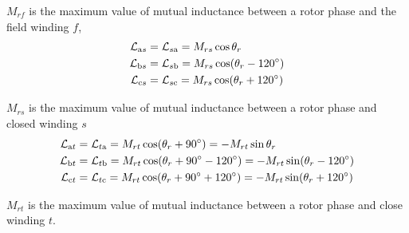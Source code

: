 \documentclass[a4paper,numbers=noenddot,12pt]{scrbook}
\begin{document}
        $M_{rf}$ is the maximum value of mutual inductance between a rotor phase and the field winding $f$,
        \begin{equation}
            \begin{aligned}
                \mathcal{L}_{\textup{a}s} & = \mathcal{L}_{s\textup{a}} = M_{rs} \cos \theta_r \\
                \mathcal{L}_{\textup{b}s} & = \mathcal{L}_{s\textup{b}} = M_{rs} \cos (\theta_r - 120^{\circ}) \\
                \mathcal{L}_{\textup{c}s} & = \mathcal{L}_{s\textup{c}} = M_{rs} \cos (\theta_r + 120^{\circ}) \\
            \end{aligned}
            \label{eq:Eq8.18}
        \end{equation}

        $M_{rs}$ is the maximum value of mutual inductance between a rotor phase and closed winding $s$
        \begin{equation}
            \begin{aligned}
                \mathcal{L}_{\textup{a}t} & = \mathcal{L}_{t\textup{a}} = M_{rt} \cos (\theta_r + 90^{\circ}) = -M_{rt} \sin \theta_r \\
                \mathcal{L}_{\textup{b}t} & = \mathcal{L}_{t\textup{b}} = M_{rt} \cos (\theta_r + 90^{\circ} - 120^{\circ}) =  -M_{rt} \sin (\theta_r - 120^{\circ}) \\
                \mathcal{L}_{\textup{c}t} & = \mathcal{L}_{t\textup{c}} = M_{rt} \cos (\theta_r + 90^{\circ} + 120^{\circ}) =  -M_{rt} \sin (\theta_r + 120^{\circ}) \\
            \end{aligned}
            \label{eq_Eq8.19}
        \end{equation}

        $M_{rt}$ is the maximum value of mutual inductance between a rotor phase and close winding $t$.
\end{document}
